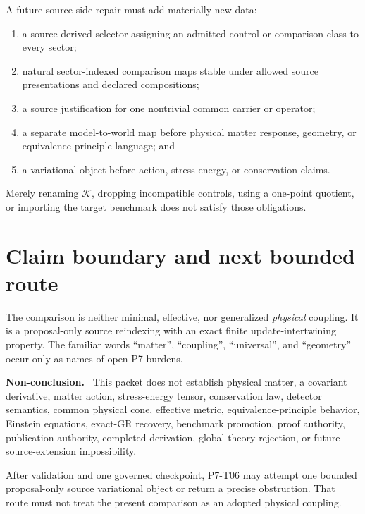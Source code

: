 \documentclass[11pt]{article}
\newenvironment{nonconclusion}{\par\smallskip\noindent\textbf{Non-conclusion.}\ }{\par\smallskip}
\newcommand{\Kmap}{\mathcal K}
\begin{document}
A future source-side repair must add materially new data:
\begin{enumerate}[leftmargin=*]
\item a source-derived selector assigning an admitted control or comparison
class to every sector;
\item natural sector-indexed comparison maps stable under allowed source
presentations and declared compositions;
\item a source justification for one nontrivial common carrier or operator;
\item a separate model-to-world map before physical matter response,
geometry, or equivalence-principle language; and
\item a variational object before action, stress-energy, or conservation
claims.
\end{enumerate}
Merely renaming \(\Kmap\), dropping incompatible controls, using a one-point
quotient, or importing the target benchmark does not satisfy those
obligations.

\section{Claim boundary and next bounded route}

The comparison is neither minimal, effective, nor generalized
\emph{physical} coupling.  It is a proposal-only source reindexing with an
exact finite update-intertwining property.  The familiar words ``matter'',
``coupling'', ``universal'', and ``geometry'' occur only as names of open
P7 burdens.

\begin{nonconclusion}
This packet does not establish physical matter, a covariant derivative,
matter action, stress-energy tensor, conservation law, detector semantics,
common physical cone, effective metric, equivalence-principle behavior,
Einstein equations, exact-GR recovery, benchmark promotion, proof authority,
publication authority, completed derivation, global theory rejection, or
future source-extension impossibility.
\end{nonconclusion}

After validation and one governed checkpoint, P7-T06 may attempt one bounded
proposal-only source variational object or return a precise obstruction.
That route must not treat the present comparison as an adopted physical
coupling.
\end{document}
